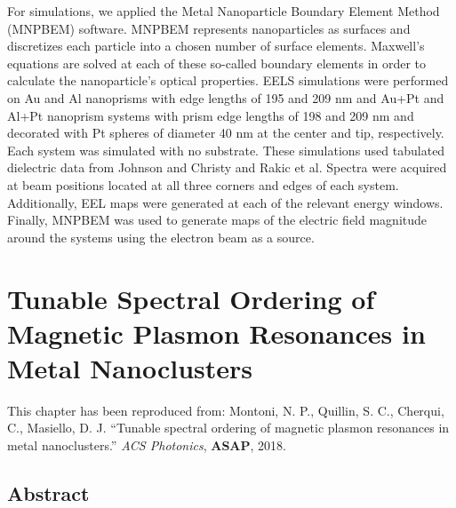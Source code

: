 \documentclass [11pt, proquest] {uwthesis}[2016/11/22]
\begin{document}
For simulations, we applied the Metal Nanoparticle Boundary Element Method (MNPBEM) software. \cite{Hohenester2012,Hohenester2014} MNPBEM represents nanoparticles as surfaces and discretizes each particle into a chosen number of surface elements. Maxwell’s equations are solved at each of these so-called boundary elements in order to calculate the nanoparticle’s optical properties. EELS simulations were performed on Au and Al nanoprisms with edge lengths of 195 and 209 nm and Au+Pt and Al+Pt nanoprism systems with prism edge lengths of 198 and 209 nm and decorated with Pt spheres of diameter 40 nm at the center and tip, respectively. Each system was simulated with no substrate. These simulations used tabulated dielectric data from Johnson and Christy \cite{JC} and Rakic et al. \cite{Rakic} Spectra were acquired at beam positions located at all three corners and edges of each system. Additionally, EEL maps were generated at each of the relevant energy windows. Finally, MNPBEM was used to generate maps of the electric field magnitude around the systems using the electron beam as a source.

\newpage
\chapter{Tunable Spectral Ordering of Magnetic Plasmon Resonances in Metal Nanoclusters}

This chapter has been reproduced from:
 Montoni, N. P., Quillin, S. C., Cherqui, C., Masiello, D. J. ``Tunable spectral ordering of magnetic plasmon resonances in metal nanoclusters.'' {\it ACS Photonics}, {\bf ASAP}, 2018. \cite{me_mag}

\section{Abstract}
\end{document}

